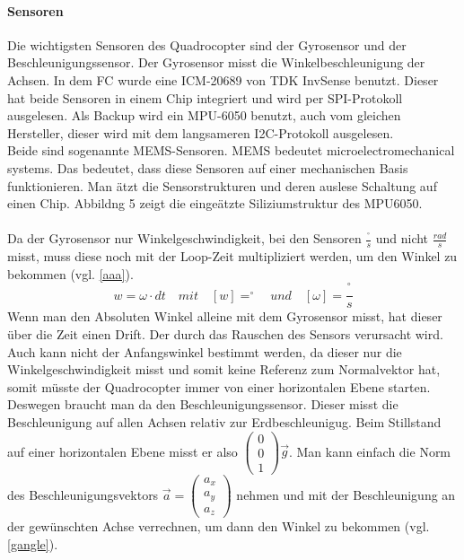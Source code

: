 \documentclass[12pt,a4paper, ngerman]{article}
\begin{document}
\paragraph{Sensoren}
Die wichtigsten Sensoren des Quadrocopter sind der Gyrosensor und der Beschleunigungssensor. Der Gyrosensor misst die Winkelbeschleunigung der Achsen. In dem FC wurde eine ICM-20689 von TDK InvSense benutzt. Dieser hat beide Sensoren in einem Chip integriert und wird per SPI-Protokoll ausgelesen. Als Backup wird ein MPU-6050 benutzt, auch vom gleichen Hersteller, dieser wird mit dem langsameren I2C-Protokoll ausgelesen. \\
Beide sind sogenannte MEMS-Sensoren. MEMS bedeutet microelectromechanical systems. Das bedeutet, dass diese Sensoren auf einer mechanischen Basis funktionieren\cite{website:elek_Komp_MEMS}. Man ätzt die Sensorstrukturen und deren auslese Schaltung auf einen Chip. Abbildng 5 zeigt die eingeätzte Siliziumstruktur des MPU6050.\\ \\
Da der Gyrosensor nur Winkelgeschwindigkeit, bei den Sensoren $\frac{^\circ}{s}$ und nicht $\frac{rad}{s}$ misst, muss diese noch mit der Loop-Zeit multipliziert werden, um den Winkel zu bekommen (vgl. \ref{aaa}).
\begin{equation}\label{aaa}
w=\omega\cdot dt \quad mit \quad [w]=^\circ \quad und \quad [\omega]=\frac{^\circ}{s}
\end{equation}
Wenn man den Absoluten Winkel alleine mit dem Gyrosensor misst, hat dieser über die Zeit einen Drift. Der durch das Rauschen des Sensors verursacht wird. Auch kann nicht der Anfangswinkel bestimmt werden, da dieser nur die Winkelgeschwindigkeit misst und somit keine Referenz zum Normalvektor hat, somit müsste der Quadrocopter immer von einer horizontalen Ebene starten. Deswegen braucht man da den Beschleunigungssensor. Dieser misst die Beschleunigung auf allen Achsen relativ zur Erdbeschleunigug. Beim Stillstand auf einer horizontalen Ebene misst er also
$
\begin{pmatrix}
0\\ 
0\\ 
1
\end{pmatrix}
\vec{g}
$. Man kann einfach die Norm des Beschleunigungsvektors $\vec{a} = \begin{pmatrix}
a_{x}\\ 
a_{y}\\ 
a_{z}
\end{pmatrix}$ nehmen und mit der Beschleunigung an der gewünschten Achse verrechnen, um dann den Winkel zu bekommen (vgl. \ref{gangle}).
\end{document}
